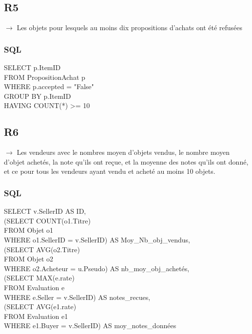 \documentclass[a4paper,11pt]{article}
\begin{document}
\subsection{R5}

$\rightarrow$ Les objets pour lesquels au moins dix propositions d'achats ont été refusées

\subsubsection{SQL}

SELECT p.ItemID\\
FROM PropositionAchat p\\
WHERE p.accepted = "False"\\
GROUP BY p.ItemID\\
HAVING COUNT(*) >= 10

\subsection{R6}

$\rightarrow$ Les vendeurs avec le nombres moyen d'objets vendus, le nombre moyen d'objet achetés, la note qu'ils ont reçue, et la moyenne des notes qu'ils ont donné, et ce pour tous les vendeurs ayant vendu et acheté au moins 10 objets.

\subsubsection{SQL}

SELECT v.SellerID AS ID, \\
(SELECT COUNT(o1.Titre)\\
FROM Objet o1 \\
WHERE o1.SellerID = v.SellerID) AS Moy\_Nb\_obj\_vendus,\\

(SELECT AVG(o2.Titre) \\
FROM Objet o2\\
WHERE o2.Acheteur = u.Pseudo) AS nb\_moy\_obj\_achetés,\\

(SELECT MAX(e.rate) \\
FROM Evaluation e\\
WHERE e.Seller = v.SellerID) AS notes\_recues,\\

(SELECT AVG(e1.rate) \\
FROM Evaluation e1\\
WHERE e1.Buyer = v.SellerID) AS moy\_notes\_données\\
\end{document}
